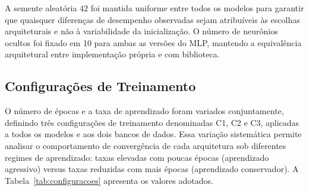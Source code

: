 \begin{table}[H]
\centering
\caption{Parâmetros fixos dos modelos implementados.}
\label{tab:hiperparametros_fixos}
\end{table}

A semente aleatória $42$ foi mantida uniforme entre todos os modelos para garantir que quaisquer diferenças de desempenho observadas sejam atribuíveis às escolhas arquiteturais e não à variabilidade da inicialização. O número de neurônios ocultos foi fixado em 10 para ambas as versões do MLP, mantendo a equivalência arquitetural entre implementação própria e com biblioteca.

\subsection{Configurações de Treinamento}

O número de épocas e a taxa de aprendizado foram variados conjuntamente, definindo três configurações de treinamento denominadas C1, C2 e C3, aplicadas a todos os modelos e aos dois bancos de dados. Essa variação sistemática permite analisar o comportamento de convergência de cada arquitetura sob diferentes regimes de aprendizado: taxas elevadas com poucas épocas (aprendizado agressivo) versus taxas reduzidas com mais épocas (aprendizado conservador). A Tabela~\ref{tab:configuracoes} apresenta os valores adotados.

